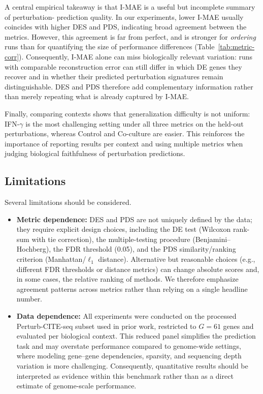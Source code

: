 \documentclass[12pt]{article}
\begin{document}
A central empirical takeaway is that I-MAE is a useful but incomplete summary of perturbation-
prediction quality. In our experiments, lower I-MAE usually coincides with higher DES and PDS,
indicating broad agreement between the metrics. However, this agreement is far from perfect, and
is stronger for \emph{ordering} runs than for quantifying the size of performance differences
(Table~\ref{tab:metric-corr}). Consequently, I-MAE alone can miss biologically relevant variation:
runs with comparable reconstruction error can still differ in which DE genes they recover and in
whether their predicted perturbation signatures remain distinguishable. DES and PDS therefore add
complementary information rather than merely repeating what is already captured by I-MAE.

Finally, comparing contexts shows that generalization difficulty is not uniform: IFN-$\gamma$ is the
most challenging setting under all three metrics on the held-out perturbations, whereas Control and
Co-culture are easier. This reinforces the importance of reporting results per context and using
multiple metrics when judging biological faithfulness of perturbation predictions.

\subsection{Limitations}
Several limitations should be considered.
\begin{itemize}
    \item \textbf{Metric dependence:} DES and PDS are not uniquely defined by the data; they require
    explicit design choices, including the DE test (Wilcoxon rank-sum with tie correction), the
    multiple-testing procedure (Benjamini--Hochberg), the FDR threshold (0.05), and the PDS
    similarity/ranking criterion (Manhattan/\(\ell_1\) distance). Alternative but reasonable choices (e.g.,
    different FDR thresholds or distance metrics) can change absolute scores and, in some cases,
    the relative ranking of methods. We therefore emphasize agreement patterns across metrics
    rather than relying on a single headline number.

    \item \textbf{Data dependence:} All experiments were conducted on the processed
    Perturb-CITE-seq subset used in prior work, restricted to \(G=61\) genes and evaluated per
    biological context. This reduced panel simplifies the prediction task and may overstate
    performance compared to genome-wide settings, where modeling gene--gene dependencies,
    sparsity, and sequencing depth variation is more challenging. Consequently, quantitative
    results should be interpreted as evidence within this benchmark rather than as a direct
    estimate of genome-scale performance.

    
\end{itemize}
\end{document}
